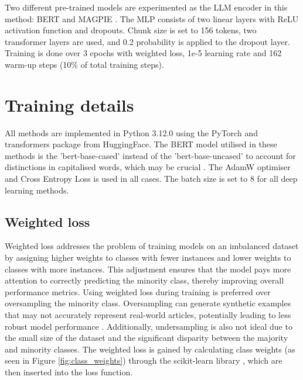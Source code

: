 Two different pre-trained models are experimented as the LLM encoder in this method: BERT \cite{devlin-2019-bert} and MAGPIE \cite{horych-2024-magpie}. The MLP consists of two linear layers with ReLU activation function \cite{agarap-2018-relu} and dropouts. Chunk size is set to 156 tokens, two transformer layers are used, and 0.2 probability is applied to the dropout layer. Training is done over 3 epochs with weighted loss, 1e-5 learning rate and 162 warm-up steps (10\% of total training steps).

\section{Training details}

All methods are implemented in Python 3.12.0 \cite{van-1995-python} using the PyTorch \cite{paszke-2017-pytorch} and transformers \cite{wolf-2020-huggingface} package from HuggingFace. The BERT model utilised in these methods is the 'bert-base-cased' instead of the 'bert-base-uncased' to account for distinctions in capitalised words, which may be crucial \cite{devlin-2019-bert}. The AdamW \cite{loshchilov-2019-adamw} optimiser and Cross Entropy Loss is used in all cases. The batch size is set to 8 for all deep learning methods.

\subsection{Weighted loss}

Weighted loss addresses the problem of training models on an imbalanced dataset by assigning higher weights to classes with fewer instances and lower weights to classes with more instances. This adjustment ensures that the model pays more attention to correctly predicting the minority class, thereby improving overall performance metrics. Using weighted loss during training is preferred over oversampling the minority class. Oversampling can generate synthetic examples that may not accurately represent real-world articles, potentially leading to less robust model performance \cite{alkhawaldeh-2023-challenges}. Additionally, undersampling is also not ideal due to the small size of the dataset and the significant disparity between the majority and minority classes. The weighted loss is gained by calculating class weights (as seen in Figure \ref{fig:class_weights}) through the scikit-learn library \cite{pedregosa-2011-scikit-learn}, which are then inserted into the loss function.

